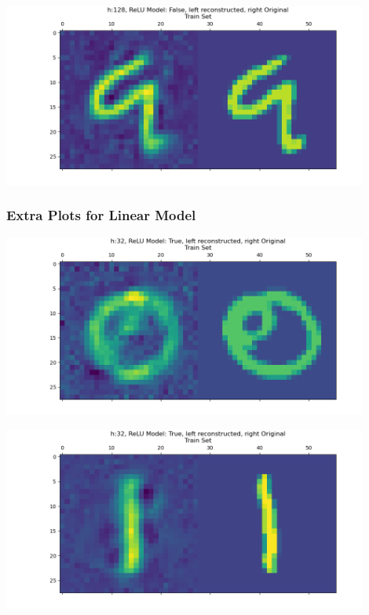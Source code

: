 \documentclass[]{article}
\begin{document}
            \begin{center}
                \includegraphics*[width=12cm]{./A4plots/06-46-49-h-128-lin-digit-9.png}
            \end{center}
        \subsubsection*{Extra Plots for Linear Model}\label{extra-a4-nonlin}
            \begin{center}
                \includegraphics*[width=12cm]{A4plots/06-50-22-h-32-nonlin-digit-0.png}
            \end{center}  
            \begin{center}
                \includegraphics*[width=12cm]{A4plots/06-50-22-h-32-nonlin-digit-1.png}
            \end{center}  
\end{document}
